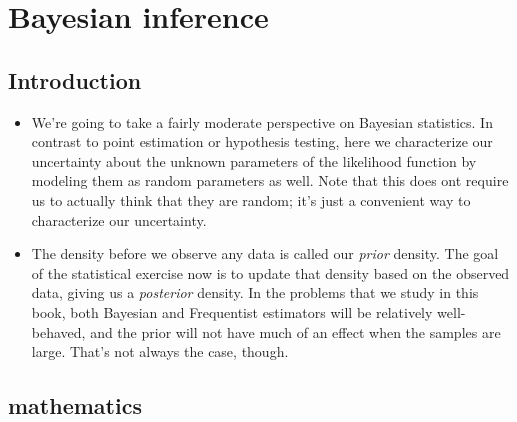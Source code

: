 

\section{Bayesian inference}

\subsection{Introduction}

\begin{itemize}[leftmargin=0pt]

\item We're going to take a fairly moderate perspective on Bayesian
  statistics.  In contrast to point estimation or hypothesis testing,
  here we characterize our uncertainty about the unknown parameters of
  the likelihood function by modeling them as random parameters as
  well.  Note that this does ont require us to actually think that
  they are random; it's just a convenient way to characterize our
  uncertainty.

\item The density before we observe any data is called our
  \emph{prior} density.  The goal of the statistical exercise now is
  to update that density based on the observed data, giving us a
  \emph{posterior} density.  In the problems that we study in this
  book, both Bayesian and Frequentist estimators will be relatively
  well-behaved, and the prior will not have much of an effect when the
  samples are large.  That's not always the case, though.

\end{itemize}

\subsection{mathematics}

